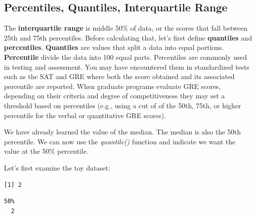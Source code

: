 \documentclass[
  11pt,
]{book}
\newenvironment{Shaded}{\begin{snugshade}}{\end{snugshade}}
\newcommand{\AttributeTok}[1]{\textcolor[rgb]{0.77,0.63,0.00}{#1}}
\newcommand{\ConstantTok}[1]{\textcolor[rgb]{0.00,0.00,0.00}{#1}}
\newcommand{\FloatTok}[1]{\textcolor[rgb]{0.00,0.00,0.81}{#1}}
\newcommand{\FunctionTok}[1]{\textcolor[rgb]{0.00,0.00,0.00}{#1}}
\newcommand{\NormalTok}[1]{#1}
\newcommand{\SpecialCharTok}[1]{\textcolor[rgb]{0.00,0.00,0.00}{#1}}
\begin{document}
\hypertarget{percentiles-quantiles-interquartile-range}{%
\subsection{Percentiles, Quantiles, Interquartile Range}\label{percentiles-quantiles-interquartile-range}}

The \textbf{interquartile range} is middle 50\% of data, or the scores that fall between 25th and 75th percentiles. Before calculating that, let's first define \textbf{quantiles} and \textbf{percentiles}. \textbf{Quantiles} are values that split a data into equal portions. \textbf{Percentile} divide the data into 100 equal parts. Percentiles are commonly used in testing and assessment. You may have encountered them in standardized tests such as the SAT and GRE where both the score obtained and its associated percentile are reported. When graduate programs evaluate GRE scores, depending on their criteria and degree of competitiveness they may set a threshold based on percentiles (e.g., using a cut of of the 50th, 75th, or higher percentile for the verbal or quantitative GRE scores).

We have already learned the value of the median. The median is also the 50th percentile. We can now use the \emph{quantile()} function and indicate we want the value at the 50\% percentile.

Let's first examine the toy dataset:

\begin{Shaded}
\end{Shaded}

\begin{verbatim}
[1] 2
\end{verbatim}

\begin{Shaded}
\end{Shaded}

\begin{verbatim}
50% 
  2 
\end{verbatim}
\end{document}
